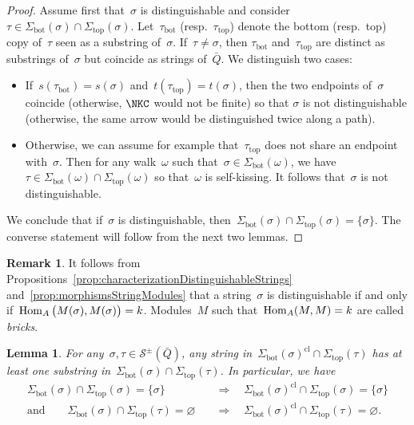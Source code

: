 \documentclass{amsart}
\newtheorem{lemma}[theorem]{Lemma}
\theoremstyle{definition}
\newtheorem{remark}[theorem]{Remark}
\newcommand{\darkblue}{\color{darkblue}} %
\newcommand{\defn}[1]{\textsl{\darkblue #1}} %
\newcommand{\strings}{\mathcal{S}} %
\renewcommand{\top}{\mathrm{top}} %
\newcommand{\bottom}{\mathrm{bot}} %
\newcommand{\closure}[1]{#1^{\mathrm{cl}}} %
\newcommand{\Hom}[1]{\operatorname{{\rm Hom}}_{#1}}
\begin{document}
\begin{proof}
Assume first that~$\sigma$ is distinguishable and consider~$\tau \in \Sigma_\bottom(\sigma) \cap \Sigma_\top(\sigma)$.
Let~$\tau_\bottom$ (resp.~$\tau_\top$) denote the bottom (resp.~top) copy of~$\tau$ seen as a substring of~$\sigma$.
If~$\tau \ne \sigma$, then $\tau_\bottom$ and~$\tau_\top$ are distinct as substrings of~$\sigma$ but coincide as strings of~$\bar Q$.
We distinguish two cases:
\begin{itemize}
\item If~$s(\tau_\bottom) = s(\sigma)$ and~$t(\tau_\top) = t(\sigma)$, then the two endpoints of~$\sigma$ coincide (otherwise, $\NKC$ would not be finite) so that $\sigma$ is not distinguishable (otherwise, the same arrow would be distinguished twice along a path).
\item Otherwise, we can assume for example that~$\tau_\top$ does not share an endpoint with~$\sigma$. Then for any walk~$\omega$ such that~$\sigma \in \Sigma_\bottom(\omega)$, we have~$\tau \in \Sigma_\bottom(\omega) \cap \Sigma_\top(\omega)$ so that~$\omega$ is self-kissing. It follows that~$\sigma$ is not distinguishable.
\end{itemize}
We conclude that if~$\sigma$ is distinguishable, then~$\Sigma_\bottom(\sigma) \cap \Sigma_\top(\sigma) = \{\sigma\}$.
%
The converse statement will follow from the next two lemmas.
\end{proof}

\begin{remark}
It follows from Propositions~\ref{prop:characterizationDistinguishableStrings} and~\ref{prop:morphismsStringModules} that a string~$\sigma$ is distinguishable if and only if~$\Hom{A} \big( M(\sigma), M(\sigma) \big) = k$.
Modules~$M$ such that~$\Hom{A}(M, M) = k$ are called \defn{bricks}.
\end{remark}

\begin{lemma}
\label{lem:sigmaBottomCapSigmaTop}
For any~$\sigma, \tau \in \strings^\pm(\bar Q)$, any string in~$\closure{\Sigma_\bottom(\sigma)} \cap \Sigma_\top(\tau)$ has at least one substring in~$\Sigma_\bottom(\sigma) \cap \Sigma_\top(\tau)$. In particular, we have
\begin{align*}
\Sigma_\bottom(\sigma) \cap \Sigma_\top(\sigma) = \{\sigma\} & \quad \Longrightarrow \quad \closure{\Sigma_\bottom(\sigma)} \cap \Sigma_\top(\sigma) = \{\sigma\} \\
\text{and}\qquad
\Sigma_\bottom(\sigma) \cap \Sigma_\top(\tau) = \varnothing & \quad \Longrightarrow \quad \closure{\Sigma_\bottom(\sigma)} \cap \Sigma_\top(\tau) = \varnothing.
\end{align*}
\end{lemma}
\end{document}

